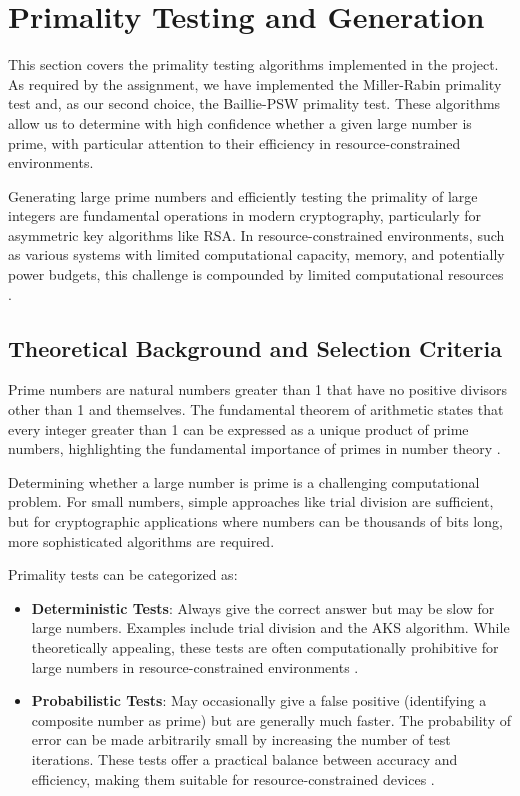 \section{Primality Testing and Generation}

This section covers the primality testing algorithms implemented in the project. As required by the assignment, we have implemented the Miller-Rabin primality test and, as our second choice, the Baillie-PSW primality test. These algorithms allow us to determine with high confidence whether a given large number is prime, with particular attention to their efficiency in resource-constrained environments.

Generating large prime numbers and efficiently testing the primality of large integers are fundamental operations in modern cryptography, particularly for asymmetric key algorithms like RSA. In resource-constrained environments, such as various systems with limited computational capacity, memory, and potentially power budgets, this challenge is compounded by limited computational resources \cite{resource_constrained}.

\subsection{Theoretical Background and Selection Criteria}

Prime numbers are natural numbers greater than 1 that have no positive divisors other than 1 and themselves. The fundamental theorem of arithmetic states that every integer greater than 1 can be expressed as a unique product of prime numbers, highlighting the fundamental importance of primes in number theory \cite{crandall2005}.

Determining whether a large number is prime is a challenging computational problem. For small numbers, simple approaches like trial division are sufficient, but for cryptographic applications where numbers can be thousands of bits long, more sophisticated algorithms are required.

Primality tests can be categorized as:

\begin{itemize}
    \item \textbf{Deterministic Tests}: Always give the correct answer but may be slow for large numbers. Examples include trial division and the AKS algorithm. While theoretically appealing, these tests are often computationally prohibitive for large numbers in resource-constrained environments \cite{taxonomy_primality}.
    
    \item \textbf{Probabilistic Tests}: May occasionally give a false positive (identifying a composite number as prime) but are generally much faster. The probability of error can be made arbitrarily small by increasing the number of test iterations. These tests offer a practical balance between accuracy and efficiency, making them suitable for resource-constrained devices \cite{hardware_baillie}.
\end{itemize}

